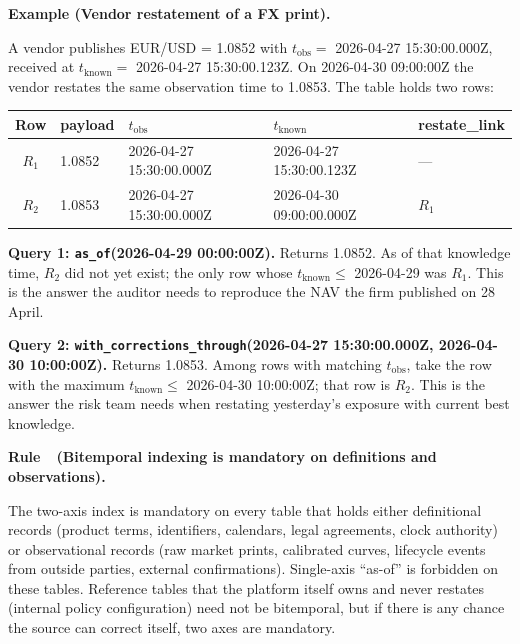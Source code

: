 \documentclass[11pt,a4paper]{article}
\newcounter{rul}
\newenvironment{rul}[1]{%
  \refstepcounter{rul}\par\medskip\noindent\textbf{Rule~\therul\ (#1).}\ %
}{\par\medskip}
\newenvironment{exmp}[1]{%
  \par\medskip\noindent\textbf{Example (#1).}\ %
}{\par\medskip}
\begin{document}
\begin{exmp}{Vendor restatement of a FX print}
A vendor publishes EUR/USD = 1.0852 with $t_{\text{obs}} =$ 2026-04-27 15:30:00.000Z, received at $t_{\text{known}} =$ 2026-04-27 15:30:00.123Z. On 2026-04-30 09:00:00Z the vendor restates the same observation time to 1.0853. The table holds two rows:

\begin{center}
\begin{tabular}{cllll}
\toprule
Row & payload & $t_{\text{obs}}$ & $t_{\text{known}}$ & restate\_link \\
\midrule
$R_1$ & 1.0852 & 2026-04-27 15:30:00.000Z & 2026-04-27 15:30:00.123Z & --- \\
$R_2$ & 1.0853 & 2026-04-27 15:30:00.000Z & 2026-04-30 09:00:00.000Z & $R_1$ \\
\bottomrule
\end{tabular}
\end{center}

\noindent\textbf{Query 1: \texttt{as\_of}(2026-04-29 00:00:00Z).} Returns 1.0852. As of that knowledge time, $R_2$ did not yet exist; the only row whose $t_{\text{known}} \le$ 2026-04-29 was $R_1$. This is the answer the auditor needs to reproduce the NAV the firm published on 28 April.

\noindent\textbf{Query 2: \texttt{with\_corrections\_through}(2026-04-27 15:30:00.000Z, 2026-04-30 10:00:00Z).} Returns 1.0853. Among rows with matching $t_{\text{obs}}$, take the row with the maximum $t_{\text{known}} \le$ 2026-04-30 10:00:00Z; that row is $R_2$. This is the answer the risk team needs when restating yesterday's exposure with current best knowledge.
\end{exmp}

\begin{rul}{Bitemporal indexing is mandatory on definitions and observations}
The two-axis index is mandatory on every table that holds either definitional records (product terms, identifiers, calendars, legal agreements, clock authority) or observational records (raw market prints, calibrated curves, lifecycle events from outside parties, external confirmations). Single-axis ``as-of'' is forbidden on these tables. Reference tables that the platform itself owns and never restates (internal policy configuration) need not be bitemporal, but if there is any chance the source can correct itself, two axes are mandatory.
\end{rul}
\end{document}
